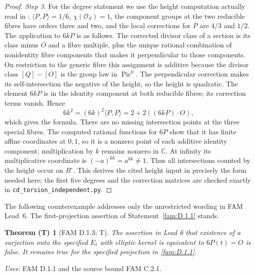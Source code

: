 \documentclass[11pt,a4paper]{article}
\theoremstyle{plain}
\newtheorem{theorem}{Theorem (T)}[section]
\theoremstyle{definition}
\begin{document}
\begin{proof}
\par\noindent\textit{Step 3.} For the degree statement we use the height computation actually read in
\cite[Lemma 2.1 and proof]{E26}: \(\langle P,P\rangle=1/6\),
\(\chi(\mathcal O_S)=1\), the component groups at the two reducible fibres
have orders three and two, and the local corrections for \(P\) are
\(4/3\) and \(1/2\). The application to \(6kP\) is as follows.
The corrected divisor class of a section is its class minus \(O\) and
a fibre multiple, plus the unique rational combination of nonidentity
fibre components that makes it perpendicular to those components.
On restriction to the generic fibre this assignment is additive because
the divisor class \([Q]-[O]\) is the group law in \(\operatorname{Pic}^0\).
The perpendicular correction makes its self-intersection the negative of
the height, so the height is quadratic. The element \(6kP\) is in the
identity component at both reducible fibres; its correction terms vanish.
Hence
\[
 6k^2=(6k)^2\langle P,P\rangle
 =2+2((6kP)\mathbin{\cdot}O),
\]
which gives the formula. There are no missing intersection points at the
three special fibres. The computed rational functions for \(6P\) show
that it has finite affine coordinates at \(0,1\), so it is a nonzero point
of each additive identity component; multiplication by \(k\) remains
nonzero in \(\mathbb C\). At infinity its multiplicative coordinate is
\((-a)^{6k}=a^{6k}\ne1\). Thus all intersections counted by the height
occur on \(B^\circ\). This derives the cited height input in precisely
the form needed here; the first five degrees and the correction matrices
are checked exactly in \texttt{cd\_torsion\_independent.py}.
\end{proof}

\noindent The following counterexample addresses only the unrestricted wording in FAM Lead~6. The first-projection assertion of Statement~\ref{fam:D.1.1} stands.\par
\begin{theorem}[FAM D.1.3; T]\label{fam:D.1.3}
The assertion in Lead 6 that \emph{existence of a surjection onto the
specified \(E_t\) with elliptic kernel} is equivalent to \(6P(t)=O\)
is false. It remains true for the specified projection in \ref{fam:D.1.1}.
\end{theorem}
\noindent\emph{Uses:} FAM D.1.1 and the source bound FAM C.2.1.\par
\end{document}
